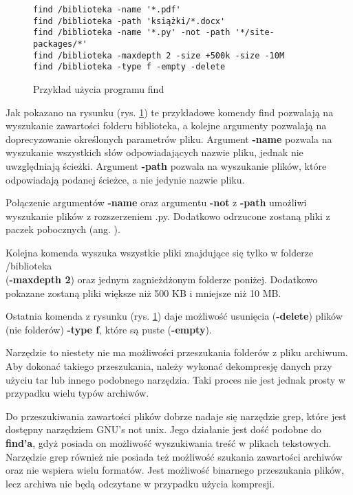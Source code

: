 \begin{figure}[htbp]
  \centering
\begin{tcolorbox}[
    colback=white,
    colframe=black,
    boxrule=0.5pt,
    arc=0pt
]
  \begin{verbatim}
find /biblioteka -name '*.pdf'
find /biblioteka -path 'książki/*.docx' 
find /biblioteka -name '*.py' -not -path '*/site-packages/*'  
find /biblioteka -maxdepth 2 -size +500k -size -10M           
find /biblioteka -type f -empty -delete 
  \end{verbatim}
\end{tcolorbox}
\caption{Przykład użycia programu find}
\label{fig:cmd:findExamples}
\end{figure}

Jak pokazano na rysunku (rys. \ref{fig:cmd:findExamples}) te przykładowe komendy find
pozwalają na wyszukanie zawartości folderu biblioteka, a kolejne argumenty 
pozwalają na doprecyzowanie określonych parametrów pliku. Argument \textbf{-name}
pozwala na wyszukanie wszystkich słów odpowiadających nazwie pliku, jednak nie
uwzględniają ścieżki. Argument \textbf{-path} pozwala na wyszukanie plików, 
które odpowiadają podanej ścieżce, a nie jedynie nazwie pliku.

Połączenie argumentów \textbf{-name} oraz argumentu \textbf{-not} z \textbf{-path}
umożliwi wyszukanie plików z rozszerzeniem .py. Dodatkowo odrzucone zostaną 
pliki z paczek pobocznych (ang. ).

Kolejna komenda wyszuka wszystkie pliki znajdujące się tylko w folderze 
/biblioteka \\ (\textbf{-maxdepth 2}) oraz jednym zagnieżdżonym folderze poniżej.
Dodatkowo pokazane zostaną pliki większe niż 500 KB i mniejsze niż 10 MB.

Ostatnia komenda z rysunku (rys. \ref{fig:cmd:findExamples}) daje możliwość usunięcia 
(\textbf{-delete}) plików (nie folderów) \textbf{-type f}, które są puste (\textbf{-empty}).

Narzędzie to niestety nie ma możliwości przeszukania folderów z pliku
archiwum. Aby dokonać takiego przeszukania, należy wykonać dekompresję danych
przy użyciu tar lub innego podobnego narzędzia. Taki proces nie jest jednak 
prosty w przypadku wielu typów archiwów.

Do przeszukiwania zawartości plików dobrze nadaje się narzędzie grep, które jest
dostępny narzędziem GNU's not unix. Jego działanie jest dość podobne do \textbf{find'a},
gdyż posiada on możliwość wyszukiwania treść w plikach tekstowych. Narzędzie grep również nie 
posiada też możliwość szukania zawartości archiwów oraz nie wspiera wielu 
formatów. Jest możliwość binarnego przeszukania plików, lecz archiwa nie będą 
odczytane w przypadku użycia kompresji.

